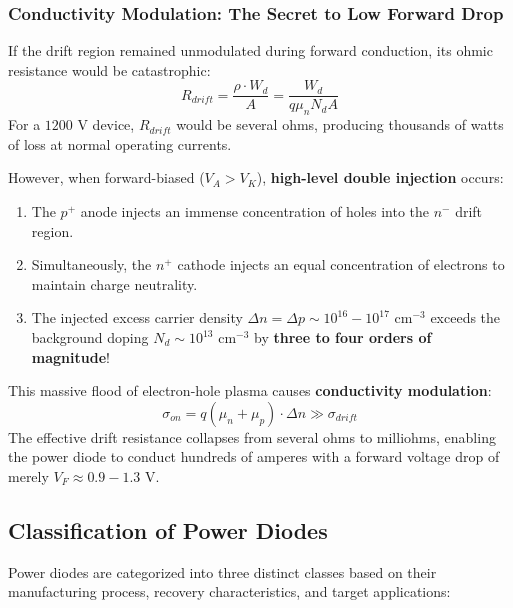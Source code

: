 \documentclass[11pt,a4paper]{article}
\begin{document}
\subsubsection{Conductivity Modulation: The Secret to Low Forward Drop}
If the drift region remained unmodulated during forward conduction, its ohmic resistance would be catastrophic:
\begin{equation}
R_{drift} = \frac{\rho \cdot W_d}{A} = \frac{W_d}{q \mu_n N_d A}
\end{equation}
For a $1200\text{ V}$ device, $R_{drift}$ would be several ohms, producing thousands of watts of loss at normal operating currents.

However, when forward-biased ($V_A > V_K$), \textbf{high-level double injection} occurs:
\begin{enumerate}
  \item The $p^+$ anode injects an immense concentration of holes into the $n^-$ drift region.
  \item Simultaneously, the $n^+$ cathode injects an equal concentration of electrons to maintain charge neutrality.
  \item The injected excess carrier density $\Delta n = \Delta p \sim 10^{16} - 10^{17}\text{ cm}^{-3}$ exceeds the background doping $N_d \sim 10^{13}\text{ cm}^{-3}$ by \textbf{three to four orders of magnitude}!
\end{enumerate}
This massive flood of electron-hole plasma causes \textbf{conductivity modulation}:
\begin{equation}
\sigma_{on} = q (\mu_n + \mu_p) \cdot \Delta n \gg \sigma_{drift}
\end{equation}
The effective drift resistance collapses from several ohms to milliohms, enabling the power diode to conduct hundreds of amperes with a forward voltage drop of merely $V_F \approx 0.9 - 1.3\text{ V}$.

\subsection{Classification of Power Diodes}

Power diodes are categorized into three distinct classes based on their manufacturing process, recovery characteristics, and target applications:
\end{document}
